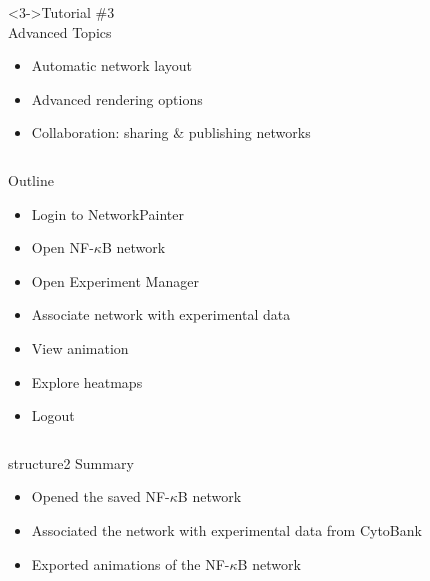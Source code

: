 \documentclass[mathserif]{beamer}
\begin{document}
\begin{frame}
\begin{columns}[t]
\begin{column}{2.1in}
\begin{block}<3->{\small Tutorial \#3\\Advanced Topics}
\scriptsize
\begin{itemize}
\item Automatic network layout
\item Advanced rendering options
\item Collaboration: sharing \& publishing networks
\end{itemize}
\end{block}

\end{column}
\end{columns}
\end{frame}

\begin{frame}{Outline}
\begin{itemize}
\item Login to NetworkPainter
\item Open NF-$\kappa$B network
\item Open Experiment Manager
\item Associate network with experimental data
\item View animation
\item Explore heatmaps
\item Logout
\end{itemize}
\end{frame}

\begin{frame}
\begin{columns}
\begin{column}{3.5in}
\begin{center}
\begin{beamercolorbox}[rounded=true,shadow=true,center,sep=0.01cm]{structure2}
\LARGE
Summary
\end{beamercolorbox}
\begin{itemize}
\item Opened the saved NF-$\kappa$B network
\item Associated the network with experimental data from CytoBank
\item Exported animations of the NF-$\kappa$B network
\end{itemize}
\end{center}
\end{column}
\end{columns}
\end{frame}
\end{document}
